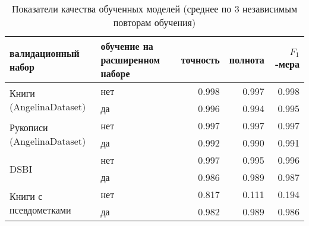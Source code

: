 \documentclass{main.tex}[subfiles]
\begin{document}
\begin{table}[ht]
    \centering
    \caption{Показатели качества обученных моделей (среднее по 3 независимым повторам обучения)}
    \begin{tabular}{l p{} rrr}
        \hline
        валидационный набор & обучение на расширенном наборе & точность & полнота & $F_1$-мера \\
        \hline
        \multirow{2}{*}{ Книги (AngelinaDataset) }
         & нет & 0.998 & 0.997 & 0.998 \\
         & да  & 0.996 & 0.994 & 0.995 \\
        \multirow{2}{*}{ Рукописи (AngelinaDataset) }
         & нет & 0.997 & 0.997 & 0.997 \\
         & да  & 0.992 & 0.990 & 0.991 \\
        \multirow{2}{*}{ DSBI }
         & нет & 0.997 & 0.995 & 0.996 \\
         & да & 0.986 & 0.989 & 0.987 \\
        \multirow{2}{*}{ Книги с псевдометками }
         & нет & 0.817 & 0.111 & 0.194 \\
         & да & 0.982 & 0.989 & 0.986 \\
        \hline
    \end{tabular}
    \label{table:validate_results}
\end{table}
\end{document}
